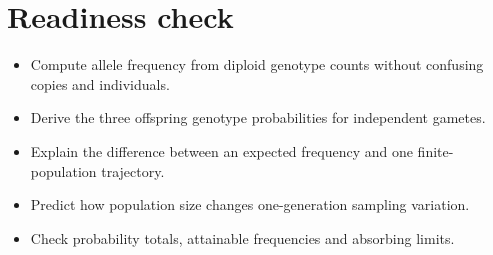 \documentclass[11pt,letterpaper]{article}
\theoremstyle{definition}\newtheorem{definition}{Definition}\newtheorem{example}{Example}
\numberwithin{equation}{section}
\begin{document}
\section*{Readiness check}
\begin{itemize}
\item Compute allele frequency from diploid genotype counts without confusing copies and individuals.
\item Derive the three offspring genotype probabilities for independent gametes.
\item Explain the difference between an expected frequency and one finite-population trajectory.
\item Predict how population size changes one-generation sampling variation.
\item Check probability totals, attainable frequencies and absorbing limits.
\end{itemize}
\end{document}
